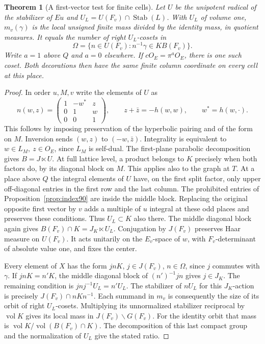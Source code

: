 \documentclass[a4paper,11pt]{article}
\newtheorem{theorem}[proposition]{Theorem}
\theoremstyle{definition}
\theoremstyle{remark}
\numberwithin{equation}{section}
\begin{document}
\begin{theorem}[A first-vector test for finite cells]\leavevmode
\label{thm:finite281}
Let \(U\) be the unipotent radical of the stabilizer of \(Eu\)
and \(U_L=U(F_v)\cap\operatorname{Stab}(L)\).
With \(U_L\) of volume one, \(m_v(\gamma)\) is the local
unsigned finite mass divided by the identity mass, in
quotient measures. It equals the number of right \(U_L\)-cosets
in
\[
                 \Omega=\{n\in U(F_v):n^{-1}\gamma\in K B(F_v)\}.
\]
Write \(a=1\) above \(Q\) and \(a=0\) elsewhere. If
\(cO_E=\pi^a O_E\), there is one such coset. Both decorations
then have the same finite column coordinate on every cell
at this place.
\end{theorem}
\begin{proof}
In order \(u,M,v\) write the elements of \(U\) as
\[
 n(w,z)=
 \begin{pmatrix}1&-w^*&z\\0&1&w\\0&0&1\end{pmatrix},
 \qquad z+\bar z=-h(w,w),\qquad w^*=h(w,\cdot).
\]
This follows by imposing preservation of the hyperbolic
pairing and of the form on \(M\). Inversion sends \((w,z)\)
to \((-w,\bar z)\). Integrality is equivalent to
\(w\in L_M,\ z\in O_E\), since \(L_M\) is self-dual.
The first-plane parabolic decomposition gives \(B=J\ltimes U\).
At full lattice level, a product belongs to \(K\) precisely
when both factors do, by its diagonal block on \(M\). This
applies also to the graph at \(T\). At a place above \(Q\)
the integral elements of \(U\) have, on the first split
factor, only upper off-diagonal entries in the first row and
the last column. The prohibited entries of
Proposition~\ref{prop:index90} are inside the middle block.
Replacing the original opposite first vector by \(v\) adds a
multiple of \(u\) integral at these odd places and preserves
these conditions. Thus \(U_L\subset K\) also there.
The middle diagonal block again gives
\(B(F_v)\cap K=J_K\ltimes U_L\). Conjugation by \(J(F_v)\)
preserves Haar measure on \(U(F_v)\). It acts unitarily on
the \(E_v\)-space of \(w\), with \(F_v\)-determinant of absolute
value one, and fixes the center.

Every element of \(X\) has the form \(jnK\), \(j\in J(F_v)\),
\(n\in\Omega\), since \(j\) commutes with \(\gamma\).
If \(jnK=n'K\), the middle diagonal block of
\((n')^{-1}jn\) gives \(j\in J_K\).
The remaining condition is \(jnj^{-1}U_L=n'U_L\).
The stabilizer of \(nU_L\) for this \(J_K\)-action is precisely
\(J(F_v)\cap nKn^{-1}\). Each summand in \(m_v\) is consequently
the size of its orbit of right \(U_L\)-cosets. Multiplying
its unnormalized stabilizer reciprocal by \(\operatorname{vol}K\)
gives its local mass in \(J(F_v)\backslash G(F_v)\).
For the identity orbit that mass is
\(\operatorname{vol}K/\operatorname{vol}(B(F_v)\cap K)\).
The decomposition of this last compact group and the
normalization of \(U_L\) give the stated ratio.


\end{proof}
\end{document}
